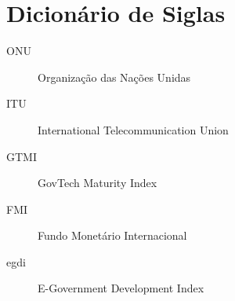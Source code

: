 \section*{Dicionário de Siglas}

\begin{description}
    \item[ONU] Organização das Nações Unidas
    \item[ITU] International Telecommunication Union
    \item[GTMI] GovTech Maturity Index
    \item[FMI] Fundo Monetário Internacional
    \item[egdi] E-Government Development Index
\end{description}